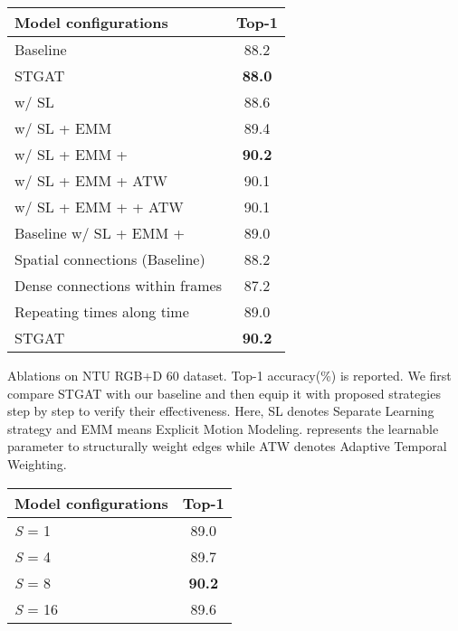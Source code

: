 \documentclass[runningheads]{llncs}
\begin{document}
\begin{minipage}{\textwidth}
\begin{minipage}[t]{0.53\textwidth}
\makeatletter{}
\centering
          \begin{tabular}[t]{l|c} 
          \hline
          \textbf{Model configurations}  & \textbf{Top-1} \\
          \hline
          \hline
          Baseline  & 88.2\\
          STGAT & \textbf{88.0}\\
          \hline
          \hline
          w/ SL  & 88.6\\
          w/ SL + EMM & 89.4 \\
          w/ SL + EMM +   & \textbf{90.2}\\
          w/ SL + EMM + ATW & 90.1\\
          w/ SL + EMM +  + ATW & 90.1\\
          Baseline w/ SL + EMM +  & 89.0\\
          \hline
          Spatial connections (Baseline) & 88.2 \\
          Dense connections within  frames & 87.2 \\
          Repeating  times along time & 89.0\\
          STGAT & \textbf{90.2} \\
          \hline
        \end{tabular}
\caption{Ablations on NTU RGB+D 60 dataset. Top-1 accuracy(\%) is reported. We first compare STGAT with our baseline and then equip it with proposed strategies step by step to verify their effectiveness. Here, SL denotes Separate Learning strategy and EMM means Explicit Motion Modeling.  represents the learnable parameter to structurally weight edges while ATW denotes Adaptive Temporal Weighting.}
        \label{table1} 
        \end{minipage}
        \begin{minipage}[t]{0.46\textwidth}
        \makeatletter{}
        \centering
        \begin{tabular}[t]{l|c} 
        \hline
        \textbf{Model configurations}  & \textbf{Top-1} \\
          \hline
          \hline
\textit{S} = 1 & 89.0\\
          \textit{S} = 4 & 89.7\\  
          \textit{S} = 8 & \textbf{90.2}\\ 
          \textit{S} = 16 & 89.6\\  

\end{tabular}
\end{minipage}
\end{minipage}
\end{document}
